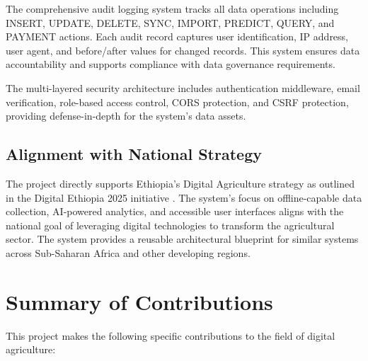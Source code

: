 The comprehensive audit logging system tracks all data operations including INSERT, UPDATE, DELETE, SYNC, IMPORT, PREDICT, QUERY, and PAYMENT actions. Each audit record captures user identification, IP address, user agent, and before/after values for changed records. This system ensures data accountability and supports compliance with data governance requirements.

The multi-layered security architecture includes authentication middleware, email verification, role-based access control, CORS protection, and CSRF protection, providing defense-in-depth for the system's data assets.

\subsection{Alignment with National Strategy}

The project directly supports Ethiopia's Digital Agriculture strategy as outlined in the Digital Ethiopia 2025 initiative \cite{digitalethiopia2025}. The system's focus on offline-capable data collection, AI-powered analytics, and accessible user interfaces aligns with the national goal of leveraging digital technologies to transform the agricultural sector. The system provides a reusable architectural blueprint for similar systems across Sub-Saharan Africa and other developing regions.

\section{Summary of Contributions}

This project makes the following specific contributions to the field of digital agriculture:

